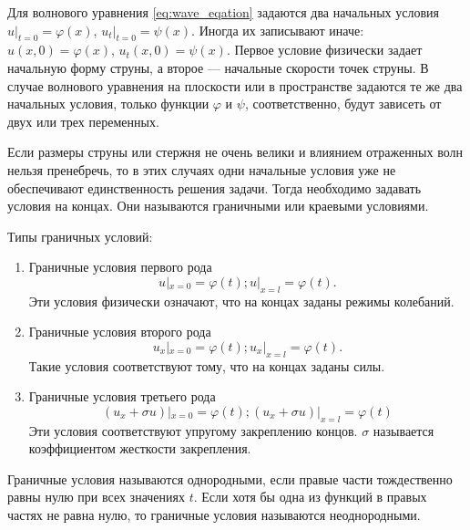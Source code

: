 \documentclass[12pt,a4paper,russian]{report}
\begin{document}
	Для волнового уравнения \eqref{eq:wave_eqation} задаются два начальных условия $u|_{t=0} = \varphi (x)$, $u_t|_{t=0} = \psi (x)$. Иногда их записывают иначе: $u(x, 0) = \varphi (x)$, $u_t(x, 0) = \psi (x)$. Первое условие физически задает начальную форму струны, а второе --- начальные скорости точек струны. 
	В случае волнового уравнения  на плоскости или в пространстве задаются те же два начальных условия, только функции $\varphi$ и $\psi$, соответственно, будут зависеть от двух или трех переменных.
	
	Если размеры струны или стержня не очень велики и влиянием отраженных волн нельзя пренебречь, то в этих случаях одни начальные условия уже не обеспечивают единственность решения задачи. Тогда необходимо задавать условия на концах. Они называются граничными или краевыми условиями. 

	Типы граничных условий:
		
	\begin{enumerate}
		\item Граничные условия первого рода \\
		\begin{equation*}
			u|_{x = 0} = \varphi (t); u|_{x = l} = \varphi (t).
		\end{equation*}
		Эти условия физически означают, что на концах заданы режимы колебаний.
		
		\item Граничные условия второго рода \\
		\begin{equation*}
			u_x|_{x = 0} = \varphi (t); u_x|_{x = l} = \varphi (t).
		\end{equation*}
		Такие условия соответствуют тому, что на концах заданы силы.
		
		\item Граничные условия третьего рода \\
		\begin{equation*}
			\left( u_x + \sigma u \right) |_{x = 0} =  \varphi (t);
			\left( u_x + \sigma u \right) |_{x = l} =  \varphi (t)
		\end{equation*}
		Эти условия соответствуют упругому закреплению концов.
		$\sigma$ называется коэффициентом жесткости закрепления.
	\end{enumerate}

	Граничные условия называются однородными, если правые части тождественно равны нулю при всех значениях $t$. Если хотя бы одна из функций в правых частях не равна нулю, то граничные условия называются неоднородными.
	
\end{document}
